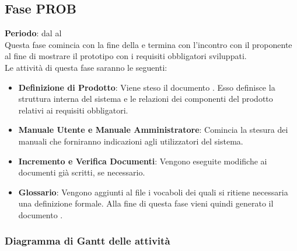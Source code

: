 \subsection{Fase PROB}
	\textbf{Periodo}: dal  al  \\Questa fase comincia con la fine della  e termina con l'incontro con il proponente al fine di mostrare il prototipo con i requisiti obbligatori sviluppati.\\Le attività di questa fase saranno le seguenti:
	\begin{itemize}
		\item\textbf{Definizione di Prodotto}: Viene steso il documento . Esso definisce la struttura interna del sistema e le relazioni dei componenti del prodotto relativi ai requisiti obbligatori.
		\item\textbf{Manuale Utente e Manuale Amministratore}: Comincia la stesura dei manuali che forniranno indicazioni agli utilizzatori del sistema.
		\item\textbf{Incremento e Verifica Documenti}: Vengono eseguite modifiche ai documenti già scritti, se necessario.
		\item\textbf{Glossario}: Vengono aggiunti al file  i vocaboli dei quali si ritiene necessaria una definizione formale. Alla fine di questa fase vieni quindi generato il documento .
	\end{itemize}
	\subsubsection{Diagramma di Gantt delle attività}
